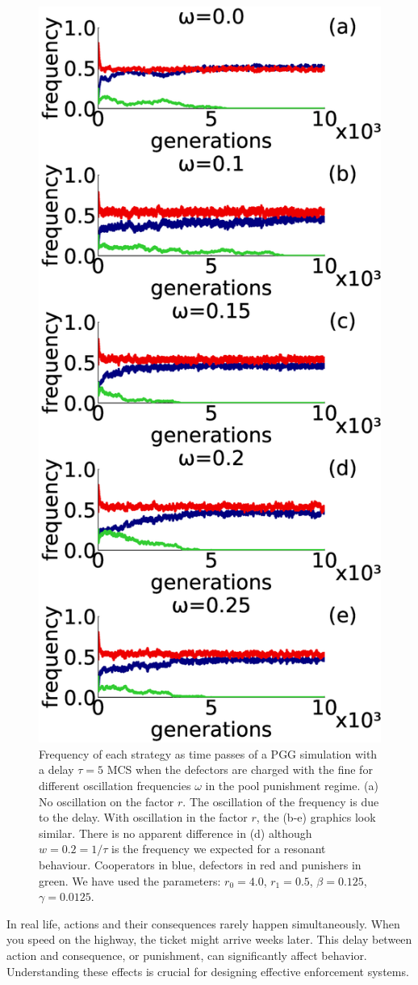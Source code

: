 \begin{figure}
	\centering
	\includegraphics[width=0.6\linewidth]{Images/P2/freq_tiempo_retardoYsin_T0_r04.0_r10.5_tau50000_L100K0.5_t10000.eps}
	\caption{Frequency of each strategy as time passes of a PGG simulation with a delay $\tau=5$ MCS when the defectors are charged with the fine for different oscillation frequencies $\omega$ in the pool punishment regime. (a) No oscillation on the factor $r$. The oscillation of the frequency is due to the delay. With oscillation in the factor $r$, the (b-e) graphics look similar. There is no apparent difference in (d) although $w=0.2=1/\tau$ is the frequency we expected for a resonant behaviour. Cooperators in blue, defectors in red and punishers in green. We have used the parameters: $r_0=4.0$, $r_1=0.5$, $\beta=0.125$, $\gamma=0.0125$.}
	\label{tiempo_retardo_oscilacion}
\end{figure}





In real life, actions and their consequences rarely happen simultaneously. When you speed on the highway, the ticket might arrive weeks later. This delay between action and consequence, or punishment, can significantly affect behavior. Understanding these effects is crucial for designing effective enforcement systems.

